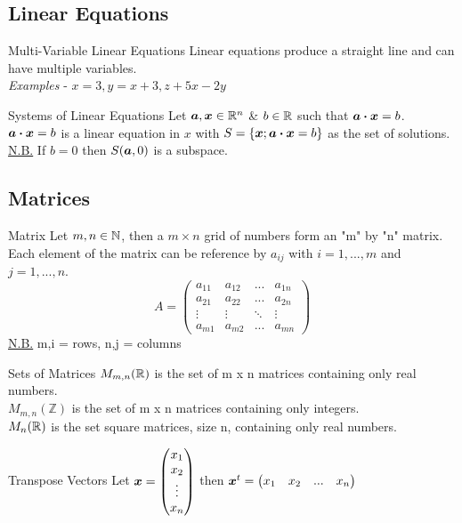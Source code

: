 \documentclass[11pt,a4paper]{article}
\begin{document}
\subsection{Linear Equations}
%
\subtitle{Definition 3.01 - }{Multi-Variable Linear Equations}
Linear equations produce a straight line and can have multiple variables. \\
\textit{Examples} - $x = 3, y = x + 3, z + 5x - 2y$ \\

\subtitle{Defintion 3.02 - }{Systems of Linear Equations}
Let $\boldsymbol{a}, \boldsymbol{x} \in \mathbb{R}^n$ \& $b \in \mathbb{R}$ such that $\boldsymbol{a} \boldsymbol{\cdot} \boldsymbol{x} = b$. \\
$\boldsymbol{a} \boldsymbol{\cdot} \boldsymbol{x} = b$ is a linear equation in $x$ with $S = \{\boldsymbol{x}; \boldsymbol{a} \boldsymbol{\cdot} \boldsymbol{x} = b\}$ as the set of solutions. \\
\underline{N.B.} If $b = 0$ then $S(\boldsymbol{a}, 0)$ is a subspace. \\

\subsection{Matrices}
%
\subtitle{Definition 3.03 - }{Matrix}
Let $m, n \in \mathbb{N}$, then a $m \times n$ grid of numbers form an "m" by "n" matrix.
Each element of the matrix can be reference by $a_{ij}$ with $i = 1, ... , m$ and $j = 1, ... , n$.
$$ A = \begin{pmatrix}
  a_{11} & a_{12} & ... & a_{1n} \\
  a_{21} & a_{22} & ... & a_{2n} \\
  \vdots & \vdots & \ddots & \vdots \\
  a_{m1} & a_{m2} & ... & a_{mn}
\end{pmatrix}
$$
\underline{N.B.} m,i = rows, n,j = columns \\

\subtitle{Definition 3.04 - }{Sets of Matrices}
$M_{m,n}(\mathbb{R})$ is the set of m x n matrices containing only real numbers. \\
$M_{m,n}(\mathbb{Z})$ is the set of m x n matrices containing only integers. \\
$M_{n}(\mathbb{R})$ is the set square matrices, size n, containing only real numbers. \\

\subtitle{Definition 3.05 - }{Transpose Vectors}
Let $\boldsymbol{x} = \begin{pmatrix} x_1 \\ x_2 \\ \vdots \\ x_n\end{pmatrix}$ then $\boldsymbol{x}^t = \begin{pmatrix} x_1 & x_2 & ... & x_n\end{pmatrix}$
\end{document}
